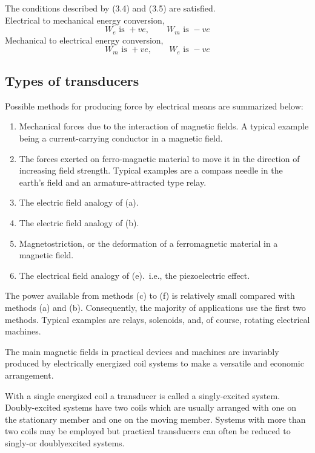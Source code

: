 \documentclass[a4paper,numbers=noenddot,12pt]{scrbook}
\begin{document}
The conditions described by (3.4) and (3.5) are satisfied.\\ Electrical to mechanical energy conversion,
\begin{equation*}
    W_e \text{\ is }+ve,\qquad W_m \text{\ is } -ve
\end{equation*}
Mechanical to electrical energy conversion,
\begin{equation*}
    W_m \text{\ is }+ve,\qquad W_e \text{\ is } -ve
\end{equation*}

\subsection{Types of transducers}
Possible methods for producing force by electrical means are summarized below:
\begin{enumerate}
    \item Mechanical forces due to the interaction of magnetic fields. A typical example being a current-carrying conductor in a magnetic field.
    \item The forces exerted on ferro-magnetic material to move it in the direction of increasing field strength. Typical examples are a compass needle in the earth's field and an armature-attracted type relay.
    \item The electric field analogy of (a).
    \item The electric field analogy of (b).
    \item Magnetostriction, or the deformation of a ferromagnetic material in a magnetic field.
    \item The electrical field analogy of (e).\ i.e., the piezoelectric effect.
\end{enumerate}

The power available from methods (c) to (f) is relatively small compared with methods (a) and (b). Consequently, the majority of applications use the first two methods. Typical examples are relays, solenoids, and, of course, rotating electrical machines. 

The main magnetic fields in practical devices and machines are invariably produced by electrically energized coil systems to make a versatile and economic arrangement. 

With a single energized coil a transducer is called a singly-excited system. Doubly-excited systems have two coils which are usually arranged with one on the stationary member and one on the moving member. Systems with more than two coils may be employed but practical transducers can often be reduced to singly-or doubly­excited systems. 
\end{document}
